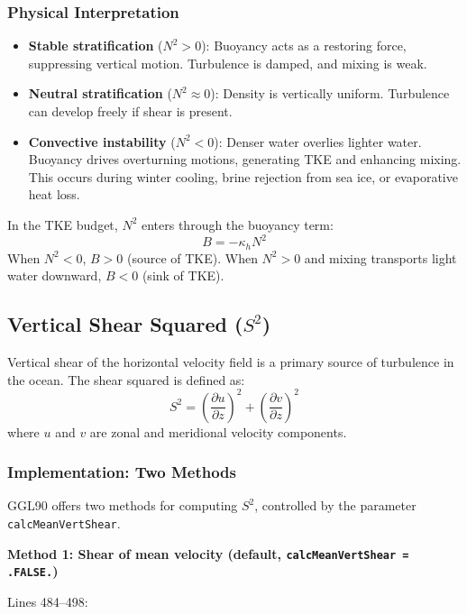\documentclass[12pt,letterpaper]{article}
\begin{document}
\subsubsection{Physical Interpretation}

\begin{itemize}[leftmargin=*]
  \item \textbf{Stable stratification} ($N^2 > 0$): Buoyancy acts as a
        restoring force, suppressing vertical motion. Turbulence is damped,
        and mixing is weak.

  \item \textbf{Neutral stratification} ($N^2 \approx 0$): Density is
        vertically uniform. Turbulence can develop freely if shear is present.

  \item \textbf{Convective instability} ($N^2 < 0$): Denser water overlies
        lighter water. Buoyancy drives overturning motions, generating TKE and
        enhancing mixing. This occurs during winter cooling, brine rejection
        from sea ice, or evaporative heat loss.
\end{itemize}

In the TKE budget, $N^2$ enters through the buoyancy term:
\[
B = -\kappa_h N^2
\]
When $N^2 < 0$, $B > 0$ (source of TKE). When $N^2 > 0$ and mixing transports
light water downward, $B < 0$ (sink of TKE).

\subsection{Vertical Shear Squared ($S^2$)}

Vertical shear of the horizontal velocity field is a primary source of
turbulence in the ocean. The shear squared is defined as:
\[
S^2 = \left( \frac{\partial u}{\partial z} \right)^2
    + \left( \frac{\partial v}{\partial z} \right)^2
\]
where $u$ and $v$ are zonal and meridional velocity components.

\subsubsection{Implementation: Two Methods}

GGL90 offers two methods for computing $S^2$, controlled by the parameter
\texttt{calcMeanVertShear}.

\textbf{Method 1: Shear of mean velocity (default, \texttt{calcMeanVertShear = .FALSE.})}

Lines 484--498:
\end{document}
